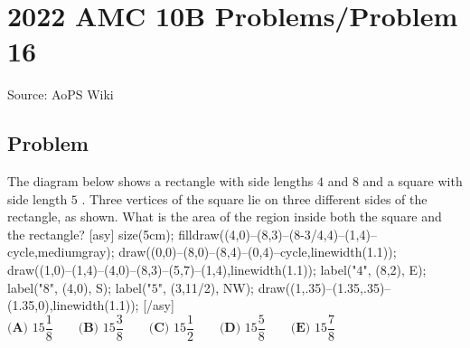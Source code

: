 \documentclass[12pt]{article}
\begin{document}
\section*{{2022 AMC 10B Problems/Problem 16}}
Source: AoPS Wiki

\subsection*{Problem}
The diagram below shows a rectangle with side lengths $4$ and $8$ and a square with side length $5$ . Three vertices of the square lie on three different sides of the rectangle, as shown. What is the area of the region inside both the square and the rectangle? [asy] size(5cm); filldraw((4,0)--(8,3)--(8-3/4,4)--(1,4)--cycle,mediumgray); draw((0,0)--(8,0)--(8,4)--(0,4)--cycle,linewidth(1.1)); draw((1,0)--(1,4)--(4,0)--(8,3)--(5,7)--(1,4),linewidth(1.1)); label("$4$", (8,2), E); label("$8$", (4,0), S); label("$5$", (3,11/2), NW); draw((1,.35)--(1.35,.35)--(1.35,0),linewidth(1.1)); [/asy] $\textbf{(A) }15\dfrac{1}{8} \qquad \textbf{(B) }15\dfrac{3}{8} \qquad \textbf{(C) }15\dfrac{1}{2} \qquad \textbf{(D) }15\dfrac{5}{8} \qquad \textbf{(E) }15\dfrac{7}{8}$
\end{document}
